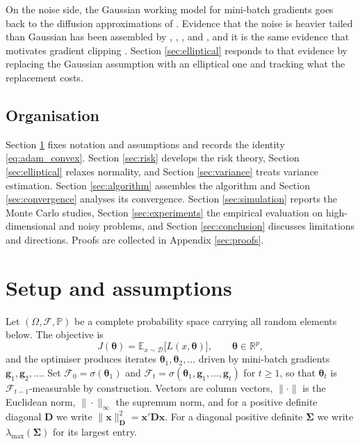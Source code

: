 \documentclass[a4paper,fleqn]{cas-dc}
\theoremstyle{plain}
\theoremstyle{definition}
\theoremstyle{remark}
\newcommand{\E}{\mathbb{E}}
\newcommand{\Real}{\mathbb{R}}
\begin{document}
On the noise side, the Gaussian working model for mini-batch gradients goes back to the diffusion approximations of \citet{mandt2017}. Evidence that the noise is heavier tailed than Gaussian has been assembled by \citet{simsekli2019}, \citet{panigrahi2019}, \citet{zhang2020attention}, and \citet{gurbuzbalaban2021}, and it is the same evidence that motivates gradient clipping \citep{zhang2020clipping}. Section \ref{sec:elliptical} responds to that evidence by replacing the Gaussian assumption with an elliptical one and tracking what the replacement costs.

\subsection{Organisation}

Section \ref{sec:setup} fixes notation and assumptions and records the identity \eqref{eq:adam_convex}. Section \ref{sec:risk} develops the risk theory, Section \ref{sec:elliptical} relaxes normality, and Section \ref{sec:variance} treats variance estimation. Section \ref{sec:algorithm} assembles the algorithm and Section \ref{sec:convergence} analyses its convergence. Section \ref{sec:simulation} reports the Monte Carlo studies, Section \ref{sec:experiments} the empirical evaluation on high-dimensional and noisy problems, and Section \ref{sec:conclusion} discusses limitations and directions. Proofs are collected in Appendix \ref{sec:proofs}.

\section{Setup and assumptions}
\label{sec:setup}

Let $(\Omega,\mathcal F,\mathbb P)$ be a complete probability space carrying all random elements below. The objective is
\begin{equation}
J(\bm\theta)=\E_{x\sim\mathcal D}\bigl[L(x,\bm\theta)\bigr],
\qquad
\bm\theta\in\Real^{p},
\end{equation}
and the optimiser produces iterates $\bm\theta_1,\bm\theta_2,\dots$ driven by mini-batch gradients $\bm g_1,\bm g_2,\dots$. Set $\mathcal F_0=\sigma(\bm\theta_1)$ and $\mathcal F_t=\sigma(\bm\theta_1,\bm g_1,\dots,\bm g_t)$ for $t\ge1$, so that $\bm\theta_t$ is $\mathcal F_{t-1}$-measurable by construction. Vectors are column vectors, $\|\cdot\|$ is the Euclidean norm, $\|\cdot\|_\infty$ the supremum norm, and for a positive definite diagonal $\bm D$ we write $\|\bm x\|^2_{\bm D}=\bm x'\bm D\bm x$. For a diagonal positive definite $\bm\Sigma$ we write $\lambda_{\max}(\bm\Sigma)$ for its largest entry.
\end{document}
